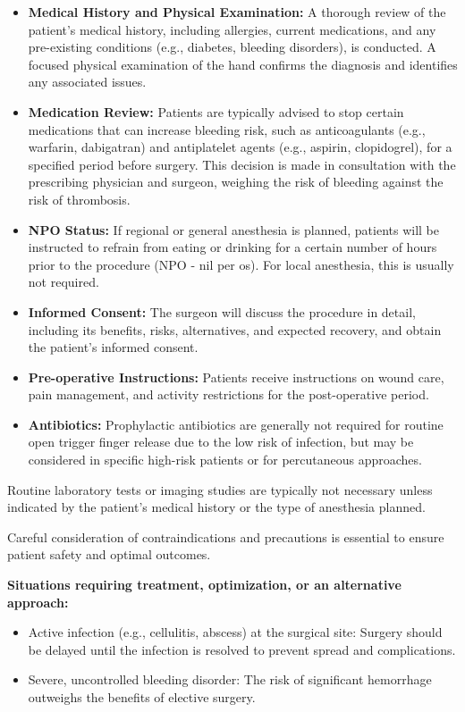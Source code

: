 \begin{itemize}
  \item \textbf{Medical History and Physical Examination:} A thorough review of the patient's medical history, including allergies, current medications, and any pre-existing conditions (e.g., diabetes, bleeding disorders), is conducted. A focused physical examination of the hand confirms the diagnosis and identifies any associated issues.
  
  \item \textbf{Medication Review:} Patients are typically advised to stop certain medications that can increase bleeding risk, such as anticoagulants (e.g., warfarin, dabigatran) and antiplatelet agents (e.g., aspirin, clopidogrel), for a specified period before surgery. This decision is made in consultation with the prescribing physician and surgeon, weighing the risk of bleeding against the risk of thrombosis.
  
  \item \textbf{NPO Status:} If regional or general anesthesia is planned, patients will be instructed to refrain from eating or drinking for a certain number of hours prior to the procedure (NPO - nil per os). For local anesthesia, this is usually not required.
  
  \item \textbf{Informed Consent:} The surgeon will discuss the procedure in detail, including its benefits, risks, alternatives, and expected recovery, and obtain the patient's informed consent.
  
  \item \textbf{Pre-operative Instructions:} Patients receive instructions on wound care, pain management, and activity restrictions for the post-operative period.
  
  \item \textbf{Antibiotics:} Prophylactic antibiotics are generally not required for routine open trigger finger release due to the low risk of infection, but may be considered in specific high-risk patients or for percutaneous approaches.
\end{itemize}

Routine laboratory tests or imaging studies are typically not necessary unless indicated by the patient's medical history or the type of anesthesia planned.

Careful consideration of contraindications and precautions is essential to ensure patient safety and optimal outcomes.

\textbf{Situations requiring treatment, optimization, or an alternative approach:}
\begin{itemize}
  \item Active infection (e.g., cellulitis, abscess) at the surgical site: Surgery should be delayed until the infection is resolved to prevent spread and complications.
  
  \item Severe, uncontrolled bleeding disorder: The risk of significant hemorrhage outweighs the benefits of elective surgery.
\end{itemize}

